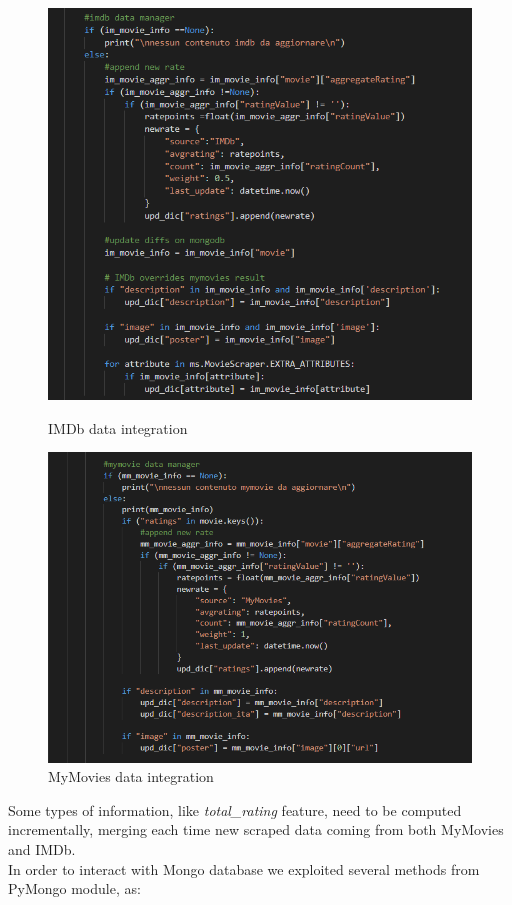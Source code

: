 \documentclass[11pt]{article}
\begin{document}
\begin{figure}[H]
    \centering
        \includegraphics[scale=.55]{figures/codepic/f4.png}
    \caption{IMDb data integration}
    \label{fig:1}
    \centering
        \includegraphics[scale=.5]{figures/codepic/f3.png}
    \caption{MyMovies data integration}
    \label{fig:1}
\end{figure}
\newpage\noindent
Some types of information, like \emph{total\_rating} feature, need to be computed incrementally, merging each time new scraped data coming from both MyMovies and IMDb.\\In order to interact with Mongo database we exploited several methods from PyMongo module, as:
\end{document}

